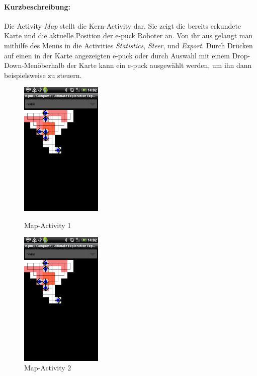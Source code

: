 \documentclass[10pt,a4paper]{article}
\begin{document}
 		\paragraph{Kurzbeschreibung:}
 		Die Activity \textit{Map} stellt die Kern-Activity dar. Sie zeigt die bereits erkundete Karte und die aktuelle Position der e-puck Roboter an. Von ihr aus gelangt man
 		mithilfe des Men\"us in die Activities \textit{Statistics}, \textit{Steer}, und \textit{Export}. Durch Dr\"ucken auf einen in der Karte angezeigten e-puck oder durch 
 		Auswahl mit einem Drop-Down-Men\" oberhalb der Karte kann ein e-puck ausgew\"ahlt werden, um ihn dann beispielsweise zu steuern.
 		\begin{figure}[htbp]
				\begin{minipage}[t]{6cm}
					\vspace{10pt}
					\includegraphics[height=6.5cm]{images/map.png} 
					\caption{Map-Activity 1}
				\end{minipage}
				\hfill
				\begin{minipage}[t]{6cm}
					\vspace{10pt}
					\includegraphics[height=6.5cm]{images/map.png} 
					\caption{Map-Activity 2}
				\end{minipage}
   			\end{figure} 	 			
 		
\end{document}
